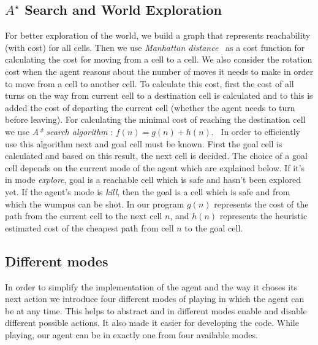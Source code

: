 \documentclass{llncs}
\begin{document}

\subsection{$A^{\star}$ Search and World Exploration}
For better exploration of the world, we build a graph that represents reachability (with cost) for all cells. Then we use \emph{Manhattan distance}~\cite{Manhattan} as a cost function for calculating the cost for moving from a cell to a cell. We also consider the rotation cost  when the agent reasons about the number of moves it needs to make in order to move from a cell to another cell. To calculate this cost, first the cost of all turns on the way from current cell to a destination cell is calculated and to this is added the cost of departing the current cell (whether the agent needs to turn before leaving). For calculating the minimal cost of reaching the destination cell we use \textit{A* search algorithm} : \(f(n) = g(n) + h(n)\). \
In order to efficiently use this algorithm next and goal cell must be known. 
First the goal cell is calculated and based on this result, the next cell is decided.  The choice of a goal cell depends on the current mode of the agent which are explained below. If it's in mode \textit{explore}, goal is a reachable cell which is safe and hasn't been explored yet. If the agent's mode is \textit{kill}, then the goal is a cell which is safe and from which the wumpus can be shot.   
In our program \(g(n)\) represents the cost of the path from the current cell to the next cell \(n\), and \(h(n)\) represents the heuristic estimated cost of the cheapest path from cell \(n\) to the goal cell. 


\subsection{Different modes}
In order to simplify the implementation of the agent and the way it choses its next action we introduce four different modes of playing in which the agent can be at any time. This helps to abstract and in different modes enable and disable different possible actions. It also made it easier for developing the code. 
While playing, our agent can be in exactly one from four available modes. 
\end{document}
